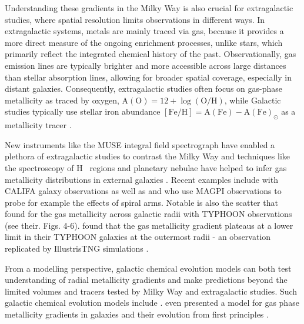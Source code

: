\documentclass[twocolumn,apj,numberedappendix,appendixfloats,twocolappendix]{openjournal}
\begin{document}
\begin{CJK*}{UTF8}{gbsn}
Understanding these gradients in the Milky Way is also crucial for extragalactic studies, where spatial resolution limits observations in different ways. In extragalactic systems, metals are mainly traced via gas, because it provides a more direct measure of the ongoing enrichment processes, unlike stars, which primarily reflect the integrated chemical history of the past. Observationally, gas emission lines are typically brighter and more accessible across large distances than stellar absorption lines, allowing for broader spatial coverage, especially in distant galaxies. Consequently, extragalactic studies often focus on gas-phase metallicity as traced by oxygen, $\mathrm{A(O)} = 12 + \log(\mathrm{O/H})$, while Galactic studies typically use stellar iron abundance $\mathrm{[Fe/H]} = \mathrm{A(Fe)} - \mathrm{A(Fe)}_\odot$ as a metallicity tracer \citep[e.g.][]{Nicholls2017, FraserMcKelvie2022}.

New instruments like the MUSE integral field spectrograph have enabled a plethora of extragalactic studies to contrast the Milky Way and techniques like the spectroscopy of H~{} regions and planetary nebulae have helped to infer gas metallicity distributions in external galaxies \citep{Shaver1983, Vilchez1996, Rolleston2000, Bresolin2012}. Recent examples include \citet{Sanchez2014} with CALIFA galaxy observations as well as \citet{Mun2024} and \citet{Chen2024} who use MAGPI observations to probe for example the effects of spiral arms. Notable is also the scatter that \citet{Chen2023} found for the gas metallicity across galactic radii with TYPHOON observations (see their. Figs. 4-6). \citet{Grasha2022} found that the gas metallicity gradient plateaus at a lower limit in their TYPHOON galaxies at the outermost radii - an observation replicated by IllustrisTNG simulations \citep{Hemler2021, Garcia2023}.

From a modelling perspective, galactic chemical evolution models can both test understanding of radial metallicity gradients and make predictions beyond the limited volumes and tracers tested by Milky Way and extragalactic studies. Such galactic chemical evolution models include \citet{Chiappini2001, Matteucci2001, Minchev2014b, Kubryk2015, Stanghellini2015, Rybizki2017, Spitoni2023, Johnson2024}. \citet{Sharda2021} even presented a model for gas phase metallicity gradients in galaxies and their evolution from first principles \citep[see also][]{Krumholz2018b}. 


\end{CJK*}
\end{document}
